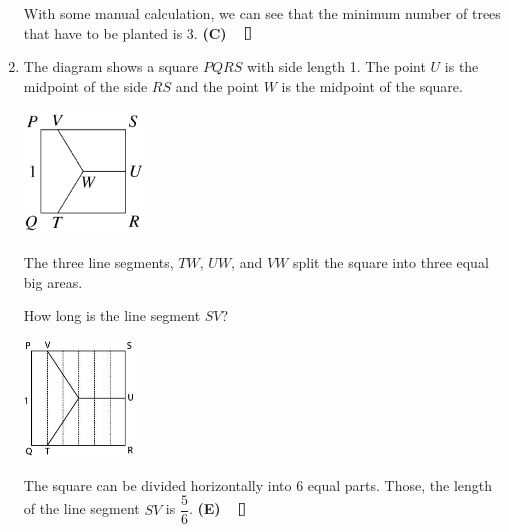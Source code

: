 \documentclass{report}
\begin{document}
\begin{multicols}{2}
\begin{enumerate}
              With some manual calculation, we can see that the minimum number of trees that
              have to be planted is 3. \textbf{(C)} $\eos$

        \item The diagram shows a square $PQRS$ with side length 1. The point $U$ is the
              midpoint of the side $RS$ and the point $W$ is the midpoint of the square.

              \begin{center}
                  \includegraphics[width=0.25\textwidth]{pictures/18.png}
              \end{center}

              The three line segments, $TW$, $UW$, and $VW$ split the square into three equal
              big areas.

              How long is the line segment $SV$?

              \sol{}

              \begin{center}
                  \includegraphics[width=0.23\textwidth]{pictures/19.jpg}
              \end{center}

              The square can be divided horizontally into 6 equal parts. Those, the length of
              the line segment $SV$ is $\dfrac{5}{6}$. \textbf{(E)} $\eos$
    \end{enumerate}
\end{multicols}
\end{document}
